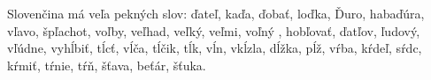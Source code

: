 Slovenčina má veľa pekných slov: 
ďateľ, kaďa, ďobať, loďka, Ďuro, habaďúra, vľavo, špľachot, voľby, veľhad,
veľký, veľmi, voľný , hobľovať, ďatľov, ľudový, vľúdne, vyhĺbiť, tĺcť, vĺča,
tĺčik, tĺk, vĺn, vkĺzla, dĺžka, pĺž, vŕba, kŕdeľ, sŕdc, kŕmiť, tŕnie, tŕň,
šťava, beťár, šťuka.
